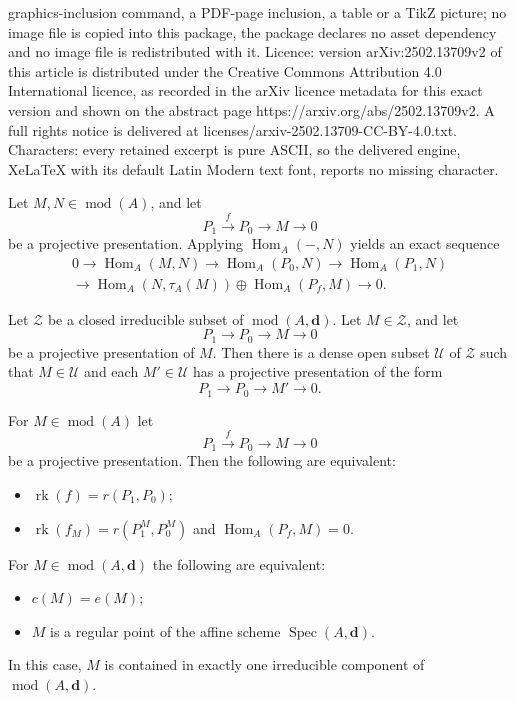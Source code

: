 \documentclass[10pt,a4paper]{amsart}
\newcommand{\Hom}{\operatorname{Hom}}
\newcommand{\Spec}{\operatorname{Spec}}
\newcommand{\bd}{\mathbf{d}}
\newcommand{\calU}{\mathcal{U}}
\newcommand{\calZ}{\mathcal{Z}}
\newcommand{\md}{\operatorname{mod}}
\newcommand{\rk}{\operatorname{rk}}
\begin{document}
graphics-inclusion command, a PDF-page inclusion, a table or a TikZ picture; no image file is copied into this package, the package declares no asset dependency and no image file is redistributed with it. Licence: version arXiv:2502.13709v2 of this article is distributed under the Creative Commons Attribution 4.0 International licence, as recorded in the arXiv licence metadata for this exact version and shown on the abstract page https://arxiv.org/abs/2502.13709v2. A full rights notice is delivered at licenses/arxiv-2502.13709-CC-BY-4.0.txt. Characters: every retained excerpt is pure ASCII, so the delivered engine, XeLaTeX with its default Latin Modern text font, reports no missing character.
\begin{Lem}
\label{lem:gvector3}
Let $M,N \in \md(A)$, and let
$$
P_1 \xrightarrow{f} P_0 \to M \to 0
$$
be a projective presentation.
Applying $\Hom_A(-,N)$ yields an exact sequence
\begin{multline*}
0 \to \Hom_A(M,N) \to \Hom_A(P_0,N) \to \Hom_A(P_1,N)
\\
\to \Hom_A(N,\tau_A(M)) \oplus \Hom_A(P_f,M) \to 0.
\end{multline*}
\end{Lem}

\begin{Lem}[{Fei}]\label{lem:presentationsemicont}
Let $\calZ$ be a closed irreducible subset of $\md(A,\bd)$.
Let $M \in \calZ$, and let
$$
P_1 \to P_0 \to M \to 0
$$ be
a projective presentation of $M$.
Then there is a dense open subset $\calU$ of $\calZ$ such that
$M \in \calU$ and
each $M' \in \calU$ has a projective presentation of the form
$$
P_1 \to P_0 \to M' \to 0.
$$
\end{Lem}

\begin{Lem}\label{lem:maxrankfM}
For $M \in \md(A)$ let
$$
P_1 \xrightarrow{f} P_0 \to M \to 0
$$
be a projective presentation.
Then the following are equivalent:
\begin{itemize}\itemsep2mm

\item[(i)]
$\rk(f) = r(P_1,P_0)$;

\item[(ii)]
$\rk(f_M) = r(P_1^M,P_0^M)$ and
$\Hom_A(P_f,M) = 0$.

\end{itemize}
\end{Lem}

\begin{Lem}\label{lem:regular}
For
$M \in \md(A,\bd)$ the following are equivalent:
\begin{itemize}\itemsep2mm

\item[(i)]
$c(M) = e(M)$;

\item[(ii)]
$M$ is a regular point of the affine scheme
$\Spec(A,\bd)$.

\end{itemize}
In this case,
$M$ is contained in exactly one irreducible component
of $\md(A,\bd)$.
\end{Lem}
\end{document}
